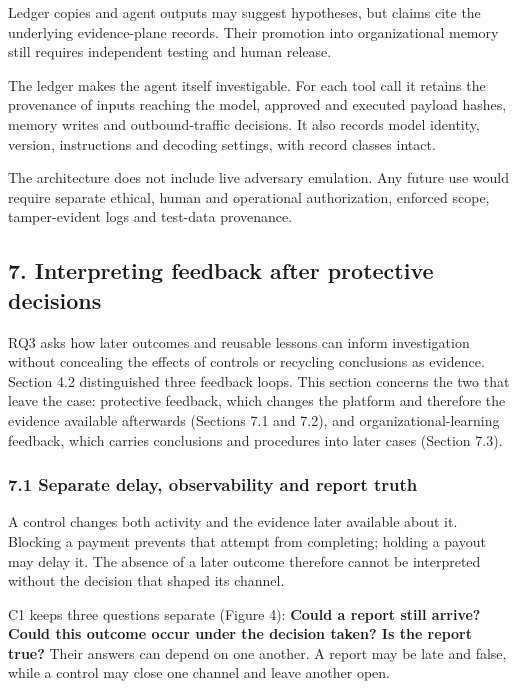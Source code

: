 \documentclass[
  11pt,
]{article}
\begin{document}
Ledger copies and agent outputs may suggest hypotheses, but claims cite
the underlying evidence-plane records. Their promotion into
organizational memory still requires independent testing and human
release.

The ledger makes the agent itself investigable. For each tool call it
retains the provenance of inputs reaching the model, approved and
executed payload hashes, memory writes and outbound-traffic decisions.
It also records model identity, version, instructions and decoding
settings, with record classes intact.

The architecture does not include live adversary emulation. Any future
use would require separate ethical, human and operational authorization,
enforced scope, tamper-evident logs and test-data provenance.

\FloatBarrier

\hypertarget{interpreting-feedback-after-protective-decisions}{%
\subsection{7. Interpreting feedback after protective
decisions}\label{interpreting-feedback-after-protective-decisions}}

\suppressfloats[t]

RQ3 asks how later outcomes and reusable lessons can inform
investigation without concealing the effects of controls or recycling
conclusions as evidence. Section 4.2 distinguished three feedback loops.
This section concerns the two that leave the case: protective feedback,
which changes the platform and therefore the evidence available
afterwards (Sections 7.1 and 7.2), and organizational-learning feedback,
which carries conclusions and procedures into later cases (Section 7.3).

\hypertarget{separate-delay-observability-and-report-truth}{%
\subsubsection{7.1 Separate delay, observability and report
truth}\label{separate-delay-observability-and-report-truth}}

A control changes both activity and the evidence later available about
it. Blocking a payment prevents that attempt from completing; holding a
payout may delay it. The absence of a later outcome therefore cannot be
interpreted without the decision that shaped its channel.

C1 keeps three questions separate (Figure 4): \textbf{Could a report
still arrive? Could this outcome occur under the decision taken? Is the
report true?} Their answers can depend on one another. A report may be
late and false, while a control may close one channel and leave another
open.
\end{document}
